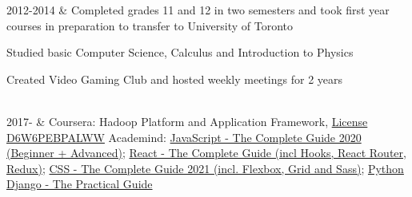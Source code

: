 \documentclass[]{cv-roald}
\begin{document}
\begin{tabularcv}
   2012-2014   &   
                   \newline Completed grades 11 and 12 in two semesters and took first year courses in preparation to transfer to University of Toronto
                   \begin{tabitemize}
                       \item Studied basic Computer Science, Calculus and Introduction to Physics
                       \item Created Video Gaming Club and hosted weekly meetings for 2 years
                   \end{tabitemize} 
                   \\[\vspacepar]
    2017-       &   
                    \newline Coursera: Hadoop Platform and Application Framework, \href{https://www.coursera.org/account/accomplishments/verify/D6W6PEBPALWW}{License D6W6PEBPALWW}
                    \newline Academind: \href{https://www.udemy.com/course/javascript-the-complete-guide-2020-beginner-advanced}{JavaScript - The Complete Guide 2020 (Beginner + Advanced)};  \href{https://pro.academind.com/p/react-the-complete-guide}{React - The Complete Guide (incl Hooks, React Router, Redux)}; \href{https://pro.academind.com/p/css-the-complete-guide-2020-incl-flexbox-grid-sass}{CSS - The Complete Guide 2021 (incl. Flexbox, Grid and Sass)}; \href{https://pro.academind.com/p/python-django-the-practical-guide}{Python Django - The Practical Guide}
\end{tabularcv}

\end{document}
